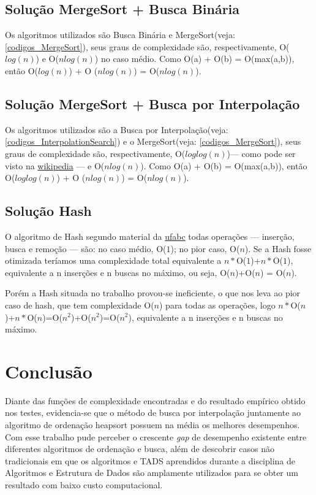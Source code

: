 \documentclass[12pt]{article}
\begin{document}
        \subsection{Solução MergeSort + Busca Binária}
            Os algoritmos utilizados são Busca Binária e MergeSort(veja: \ref{codigos_MergeSort}), seus graus de complexidade são, respectivamente, O($log(n)$) e O($nlog(n)$) no caso médio. Como O(a) + O(b) = O(max(a,b)), então O($log(n)$) + O ($nlog(n)$) = O($nlog(n)$).
            
        \subsection{Solução MergeSort + Busca por Interpolação}
            Os algoritmos utilizados são a Busca por Interpolação(veja: \ref{codigos_InterpolationSearch}) e o MergeSort(veja: \ref{codigos_MergeSort}), seus graus de complexidade são, respectivamente, O($loglog(n)$)--- como pode ser visto na \href{https://en.wikipedia.org/wiki/Interpolation_search}{wikipedia} --- e O($nlog(n)$). Como O(a) + O(b) = O(max(a,b)), então O($loglog(n)$) + O ($nlog(n)$) = O($nlog(n)$).
            
        \subsection{Solução Hash}
            O algoritmo de Hash segundo material da \href{http://professor.ufabc.edu.br/~leticia.bueno/classes/aed2/materiais/hashing.pdf}{ufabc} todas operações --- inserção, busca e remoção --- são: no caso médio, O($1$); no pior caso, O($n$). Se a Hash fosse otimizada teríamos uma complexidade total equivalente a $n*$O($1$)+$n*$O($1$), equivalente a n inserções e n buscas no máximo, ou seja, O($n$)+O($n$) = O($n$). 
            
            Porém a Hash situada no trabalho provou-se ineficiente, o que nos leva ao pior caso de hash, que tem complexidade O($n$) para todas as operações, logo $n*$O($n$)+$n*$O($n$)=O($n^2$)+O($n^2$)=O($n^2$), equivalente a n inserções e n buscas no máximo.
    \section{Conclusão}\label{conclusao}
        Diante das funções de complexidade encontradas e do resultado empírico obtido nos testes, evidencia-se que o método de busca por interpolação juntamente ao algoritmo de ordenação heapsort possuem na média os melhores desempenhos. Com esse trabalho pude perceber o crescente \textit{gap} de desempenho existente entre diferentes algoritmos de ordenação e busca, além de descobrir casos não tradicionais em que os algoritmos e TADS aprendidos durante a disciplina de Algoritmos e Estrutura de Dados são amplamente utilizados para se obter um resultado com baixo custo computacional.
\end{document}
